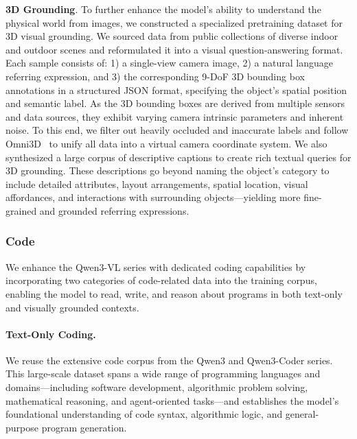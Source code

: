 \documentclass{article} %
\begin{document}
\textbf{3D Grounding}.
To further enhance the model’s ability to understand the physical world from images, we constructed a specialized pretraining dataset for 3D visual grounding. We sourced data from public collections of diverse indoor and outdoor scenes and reformulated it into a visual question-answering format. Each sample consists of:
1) a single-view camera image,
2) a natural language referring expression, and
3) the corresponding 9-DoF 3D bounding box annotations in a structured JSON format, specifying the object’s spatial position and semantic label.
%
As the 3D bounding boxes are derived from multiple sensors and data sources, they exhibit varying camera intrinsic parameters and inherent noise. To this end, we filter out heavily occluded and inaccurate labels and follow Omni3D~\citep{brazil2023omni3d} to unify all data into a virtual camera coordinate system.
%
We also synthesized a large corpus of descriptive captions to create rich textual queries for 3D grounding. These descriptions go beyond naming the object’s category to include detailed attributes, layout arrangements, spatial location, visual affordances, and interactions with surrounding objects—yielding more fine-grained and grounded referring expressions.

\subsubsection{Code}
We enhance the Qwen3-VL series with dedicated coding capabilities by incorporating two categories of code-related data into the training corpus, enabling the model to read, write, and reason about programs in both text-only and visually grounded contexts.

\paragraph{Text-Only Coding.} 
We reuse the extensive code corpus from the Qwen3 and Qwen3-Coder series. This large-scale dataset spans a wide range of programming languages and domains—including software development, algorithmic problem solving, mathematical reasoning, and agent-oriented tasks—and establishes the model’s foundational understanding of code syntax, algorithmic logic, and general-purpose program generation.
\end{document}
